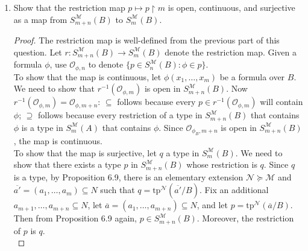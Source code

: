 \documentclass{article}
\begin{document}
\begin{enumerate}[label={\bf Q\arabic*:}]
\begin{enumerate}
      \item Show that the restriction map $p\mapsto p\restriction m$ is
        open, continuous, and surjective as a map from
        $S^{\mathcal{M}}_{m+n}(B)$ to $S^{\mathcal{M}}_{m}(B)$.

        \begin{proof}
          The restriction map is well-defined from the previous part of
          this question. Let $r:S^{\mathcal{M}}_{m+n}(B)\rightarrow
          S^{\mathcal{M}}_{m}(B)$ denote the restriction map. Given a
          formula $\phi$, use $\mathcal{O}_{\phi,n}$ to denote $\{p\in
          S^{\mathcal{M}}_n(B):\phi\in p\}$. \\

          To show that the map is continuous, let $\phi(x_1,\ldots,x_{m})$
          be a formula over $B$. We need to show that
          $r^{-1}(\mathcal{O}_{\phi,m})$ is open in
          $S^{\mathcal{M}}_{m+n}(B)$. Now
          $r^{-1}(\mathcal{O}_{\phi,m})=\mathcal{O}_{\phi,m+n}$:
          $\subseteq$ follows because every $p\in
          r^{-1}(\mathcal{O}_{\phi,m})$ will contain $\phi$; $\supseteq$
          follows because every restriction of a type in
          $S^{\mathcal{M}}_{m+n}(B)$ that contains $\phi$ is a type in
          $S^{\mathcal{M}}_m(A)$ that contains $\phi$. Since
          $\mathcal{O}_{\phi_B,m+n}$ is open in $S^{\mathcal{M}}_{m+n}(B)$,
          the map is continuous. \\

          To show that the map is surjective, let $q$ a type in
          $S^{\mathcal{M}}_{m}(B)$. We need to show that there exists a
          type $p$ in $S^{\mathcal{M}}_{m+n}(B)$ whose restriction is $q$.
          Since $q$ is a type, by Proposition 6.9, there is an elementary
          extension $\mathcal{N}\succeq\mathcal{M}$ and
          $\overline{a'}=(a_1,\ldots,a_m)\subseteq N$ such that
          $q=\text{tp}^\mathcal{N}(\overline{a'}/B)$. Fix an additional
          $a_{m+1},\ldots,a_{m+n}\subseteq N$, let
          $\overline{a}=(a_1,\ldots,a_{m+n})\subseteq N$, and let
          $p=\text{tp}^\mathcal{N}(\overline{a}/B)$. Then from Proposition
          6.9 again, $p\in S^{\mathcal{M}}_{m+n}(B)$. Moreover, the
          restriction of $p$ is $q$. \\


\end{proof}
\end{enumerate}
\end{enumerate}
\end{document}
